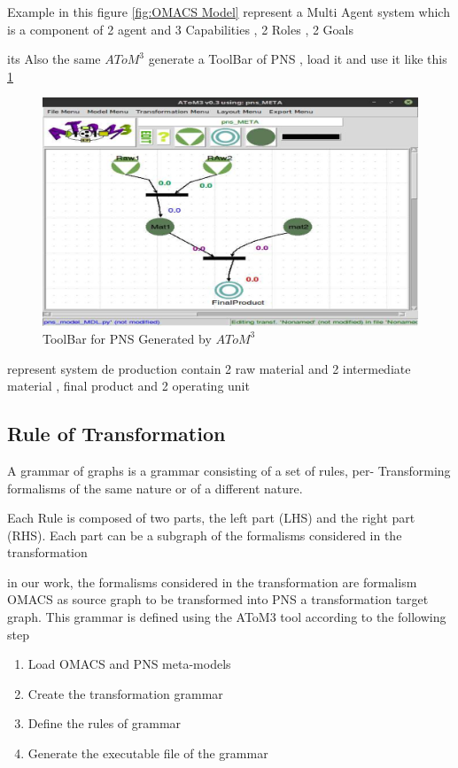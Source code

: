 Example in this figure \ref{fig:OMACS Model} represent a Multi Agent system which is 
a component of 2 agent and 3 Capabilities , 2 Roles , 2 Goals






its Also the same  $AToM^3$ generate a ToolBar of PNS , load it and use it like this \ref{fig:PNS Model}

\begin{figure}[th]
	\centering
 	\includegraphics[scale=0.5]{chapiter3/img/pnsMDL}
	\caption{\label{fig:PNS Model}ToolBar for PNS Generated by $AToM^3$}
\end{figure} 

represent system de production contain 2 raw material and 2 intermediate material , final product
and 2 operating unit 

\pagebreak
\subsection{ Rule of Transformation }
A grammar of graphs is a grammar consisting of a set of rules, per-
Transforming formalisms of the same nature or of a different nature. 

Each Rule is composed of two parts, the left part (LHS) and the right part (RHS).
Each part can be a subgraph of the formalisms considered in the transformation

in our work, the formalisms considered in the transformation are formalism
OMACS as source graph to be transformed into PNS a transformation target graph.
This grammar is defined using the AToM3 tool according to the following step

\begin{enumerate}
	\item Load OMACS and PNS meta-models
	\item Create the transformation grammar
	\item Define the rules of grammar
	\item Generate the executable file of the grammar
\end{enumerate}
 
